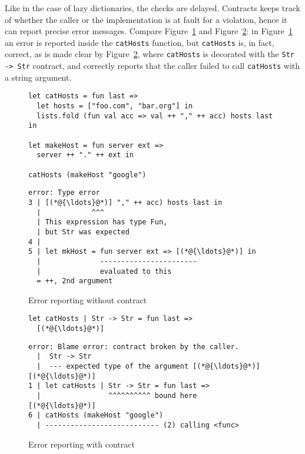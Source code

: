 \documentclass[sigplan,10pt,review,anonymous]{acmart}
\newcommand{\nickel}[1]{\lstinline[language=nickel]{#1}}
\begin{document}
Like in the case of lazy dictionaries, the checks are delayed.
Contracts keeps track of whether the caller or the implementation is
at fault for a violation, hence it can report precise error
messages. Compare Figure~\ref{fig:contract-reporting-wo} and
Figure~\ref{fig:contract-reporting-w}: in
Figure~\ref{fig:contract-reporting-wo} an error is reported inside the
\nickel{catHosts} function, but \nickel{catHosts} is, in fact,
correct, as is made clear by Figure~\ref{fig:contract-reporting-w},
where \nickel{catHosts} is decorated with the \nickel{Str -> Str}
contract, and correctly reports that the caller failed to call
\nickel{catHosts} with a string argument.

\begin{figure*}
  \centering
  \begin{subfigure}[b]{0.48\linewidth}
    \begin{lstlisting}[language=nickel]
let catHosts = fun last =>
  let hosts = ["foo.com", "bar.org"] in
  lists.fold (fun val acc => val ++ "," ++ acc) hosts last in

let makeHost = fun server ext =>
  server ++ "." ++ ext in

catHosts (makeHost "google")
\end{lstlisting}

    \begin{lstlisting}[frame=none,numbers=none, basicstyle=\footnotesize\ttfamily]
error: Type error
3 | [(*@{\ldots}@*)] "," ++ acc) hosts last in
  |            ^^^
  | This expression has type Fun,
  | but Str was expected
4 |
5 | let mkHost = fun server ext => [(*@{\ldots}@*)] in
  |              -----------------------
  |              evaluated to this
  = ++, 2nd argument
\end{lstlisting}
    \caption{Error reporting without contract}
    \label{fig:contract-reporting-wo}
  \end{subfigure}
  \hfill
  \begin{subfigure}[b]{0.48\linewidth}
    \begin{lstlisting}[language=nickel]
let catHosts | Str -> Str = fun last =>
  [(*@{\ldots}@*)]
\end{lstlisting}
\vspace{10ex}
    \begin{lstlisting}[frame=none,numbers=none, basicstyle=\footnotesize\ttfamily]
error: Blame error: contract broken by the caller.
  |  Str -> Str
  |  --- expected type of the argument [(*@{\ldots}@*)]
[(*@{\ldots}@*)]
1 | let catHosts | Str -> Str = fun last =>
  |                ^^^^^^^^^^ bound here
[(*@{\ldots}@*)]
6 | catHosts (makeHost "google")
  | --------------------------- (2) calling <func>
    \end{lstlisting}
    \caption{Error reporting with contract}
    \label{fig:contract-reporting-w}
  \end{subfigure}
  \caption{Contracts improve error messages}
\end{figure*}
\end{document}

